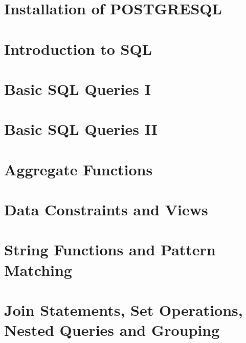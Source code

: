\documentclass[10pt,a4paper,titlepage]{report}
\begin{document}
\tableofcontents
\newpage

\sectionfont{\scshape}
\chapterfont{\scshape}

\chapter{Installation of POSTGRESQL}

\newpage

\chapter{Introduction to SQL}

\newpage

\chapter{Basic SQL Queries I}

\newpage

\chapter{Basic SQL Queries II}

\newpage

\chapter{Aggregate Functions}

\newpage

\chapter{Data Constraints and Views}

\newpage

\chapter{String Functions and Pattern Matching}

\newpage

\chapter{Join Statements, Set Operations, Nested Queries and Grouping}

\newpage
\end{document}
